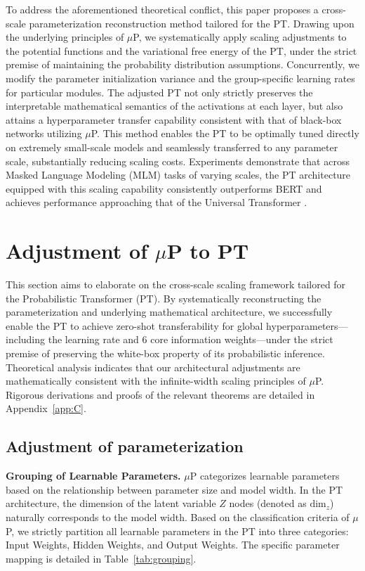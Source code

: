 \documentclass[11pt]{article}
\begin{document}
To address the aforementioned theoretical conflict, this paper proposes a cross-scale parameterization reconstruction method tailored for the PT. Drawing upon the underlying principles of $\mu$P, we systematically apply scaling adjustments to the potential functions and the variational free energy of the PT, under the strict premise of maintaining the probability distribution assumptions. Concurrently, we modify the parameter initialization variance and the group-specific learning rates for particular modules. The adjusted PT not only strictly preserves the interpretable mathematical semantics of the activations at each layer, but also attains a hyperparameter transfer capability consistent with that of black-box networks utilizing $\mu$P. This method enables the PT to be optimally tuned directly on extremely small-scale models and seamlessly transferred to any parameter scale, substantially reducing scaling costs. Experiments demonstrate that across Masked Language Modeling (MLM) tasks of varying scales, the PT architecture equipped with this scaling capability consistently outperforms BERT \cite{devlin2019bert} and achieves performance approaching that of the Universal Transformer \cite{dehghani2019universal}.

\section{Adjustment of $\mu$P to PT}

This section aims to elaborate on the cross-scale scaling framework tailored for the Probabilistic Transformer (PT). By systematically reconstructing the parameterization and underlying mathematical architecture, we successfully enable the PT to achieve zero-shot transferability for global hyperparameters—including the learning rate and 6 core information weights—under the strict premise of preserving the white-box property of its probabilistic inference. Theoretical analysis indicates that our architectural adjustments are mathematically consistent with the infinite-width scaling principles of $\mu$P. Rigorous derivations and proofs of the relevant theorems are detailed in Appendix~\ref{app:C}.

\subsection{Adjustment of parameterization}

\textbf{Grouping of Learnable Parameters.} $\mu$P categorizes learnable parameters based on the relationship between parameter size and model width. In the PT architecture, the dimension of the latent variable $Z$ nodes (denoted as $\text{dim}_z$) naturally corresponds to the model width. Based on the classification criteria of $\mu$P, we strictly partition all learnable parameters in the PT into three categories: Input Weights, Hidden Weights, and Output Weights. The specific parameter mapping is detailed in Table~\ref{tab:grouping}.\\
\end{document}
